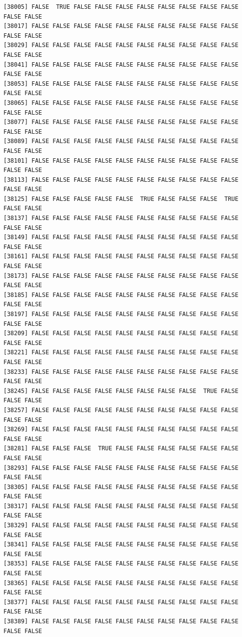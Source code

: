 \documentclass[
  a4paper,
  DIV=11,
  numbers=noendperiod]{scrartcl}
\begin{document}
\begin{verbatim}
[38005] FALSE  TRUE FALSE FALSE FALSE FALSE FALSE FALSE FALSE FALSE FALSE FALSE
[38017] FALSE FALSE FALSE FALSE FALSE FALSE FALSE FALSE FALSE FALSE FALSE FALSE
[38029] FALSE FALSE FALSE FALSE FALSE FALSE FALSE FALSE FALSE FALSE FALSE FALSE
[38041] FALSE FALSE FALSE FALSE FALSE FALSE FALSE FALSE FALSE FALSE FALSE FALSE
[38053] FALSE FALSE FALSE FALSE FALSE FALSE FALSE FALSE FALSE FALSE FALSE FALSE
[38065] FALSE FALSE FALSE FALSE FALSE FALSE FALSE FALSE FALSE FALSE FALSE FALSE
[38077] FALSE FALSE FALSE FALSE FALSE FALSE FALSE FALSE FALSE FALSE FALSE FALSE
[38089] FALSE FALSE FALSE FALSE FALSE FALSE FALSE FALSE FALSE FALSE FALSE FALSE
[38101] FALSE FALSE FALSE FALSE FALSE FALSE FALSE FALSE FALSE FALSE FALSE FALSE
[38113] FALSE FALSE FALSE FALSE FALSE FALSE FALSE FALSE FALSE FALSE FALSE FALSE
[38125] FALSE FALSE FALSE FALSE FALSE  TRUE FALSE FALSE FALSE  TRUE FALSE FALSE
[38137] FALSE FALSE FALSE FALSE FALSE FALSE FALSE FALSE FALSE FALSE FALSE FALSE
[38149] FALSE FALSE FALSE FALSE FALSE FALSE FALSE FALSE FALSE FALSE FALSE FALSE
[38161] FALSE FALSE FALSE FALSE FALSE FALSE FALSE FALSE FALSE FALSE FALSE FALSE
[38173] FALSE FALSE FALSE FALSE FALSE FALSE FALSE FALSE FALSE FALSE FALSE FALSE
[38185] FALSE FALSE FALSE FALSE FALSE FALSE FALSE FALSE FALSE FALSE FALSE FALSE
[38197] FALSE FALSE FALSE FALSE FALSE FALSE FALSE FALSE FALSE FALSE FALSE FALSE
[38209] FALSE FALSE FALSE FALSE FALSE FALSE FALSE FALSE FALSE FALSE FALSE FALSE
[38221] FALSE FALSE FALSE FALSE FALSE FALSE FALSE FALSE FALSE FALSE FALSE FALSE
[38233] FALSE FALSE FALSE FALSE FALSE FALSE FALSE FALSE FALSE FALSE FALSE FALSE
[38245] FALSE FALSE FALSE FALSE FALSE FALSE FALSE FALSE  TRUE FALSE FALSE FALSE
[38257] FALSE FALSE FALSE FALSE FALSE FALSE FALSE FALSE FALSE FALSE FALSE FALSE
[38269] FALSE FALSE FALSE FALSE FALSE FALSE FALSE FALSE FALSE FALSE FALSE FALSE
[38281] FALSE FALSE FALSE  TRUE FALSE FALSE FALSE FALSE FALSE FALSE FALSE FALSE
[38293] FALSE FALSE FALSE FALSE FALSE FALSE FALSE FALSE FALSE FALSE FALSE FALSE
[38305] FALSE FALSE FALSE FALSE FALSE FALSE FALSE FALSE FALSE FALSE FALSE FALSE
[38317] FALSE FALSE FALSE FALSE FALSE FALSE FALSE FALSE FALSE FALSE FALSE FALSE
[38329] FALSE FALSE FALSE FALSE FALSE FALSE FALSE FALSE FALSE FALSE FALSE FALSE
[38341] FALSE FALSE FALSE FALSE FALSE FALSE FALSE FALSE FALSE FALSE FALSE FALSE
[38353] FALSE FALSE FALSE FALSE FALSE FALSE FALSE FALSE FALSE FALSE FALSE FALSE
[38365] FALSE FALSE FALSE FALSE FALSE FALSE FALSE FALSE FALSE FALSE FALSE FALSE
[38377] FALSE FALSE FALSE FALSE FALSE FALSE FALSE FALSE FALSE FALSE FALSE FALSE
[38389] FALSE FALSE FALSE FALSE FALSE FALSE FALSE FALSE FALSE FALSE FALSE FALSE

\end{verbatim}
\end{document}
